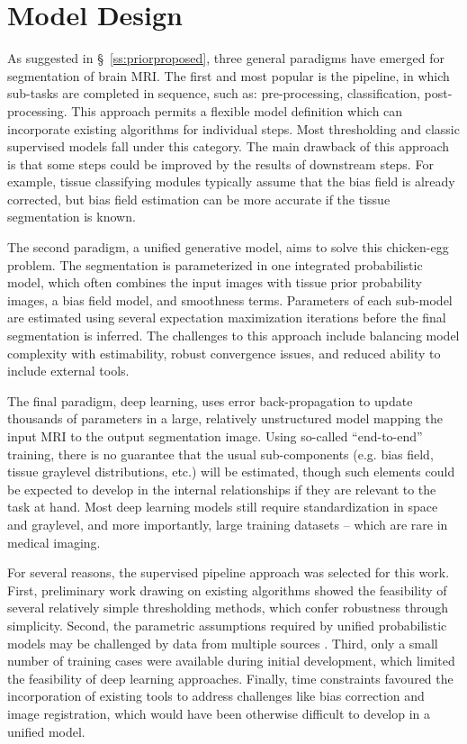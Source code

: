 \section{Model Design}\label{s:modelconcept}
As suggested in \S\ \ref{ss:priorproposed}, three general paradigms have emerged for segmentation of brain MRI.
The first and most popular is the pipeline, in which sub-tasks are completed in sequence, such as: pre-processing, classification, post-processing.
This approach permits a flexible model definition which can incorporate existing algorithms for individual steps.
Most thresholding and classic supervised models fall under this category.
The main drawback of this approach is that some steps could be improved by the results of downstream steps.
For example, tissue classifying modules typically assume that the bias field is already corrected, but bias field estimation can be more accurate if the tissue segmentation is known.
\par
The second paradigm, a unified generative model, aims to solve this chicken-egg problem.
The segmentation is parameterized in one integrated probabilistic model, which often combines the input images with tissue prior probability images, a bias field model, and smoothness terms.
Parameters of each sub-model are estimated using several expectation maximization iterations before the final segmentation is inferred.
The challenges to this approach include balancing model complexity with estimability, robust convergence issues, and reduced ability to include external tools.
\par
The final paradigm, deep learning, uses error back-propagation to update thousands of parameters in a large, relatively unstructured model mapping the input MRI to the output segmentation image.
Using so-called ``end-to-end'' training, there is no guarantee that the usual sub-components (e.g. bias field, tissue graylevel distributions, etc.) will be estimated, though such elements could be expected to develop in the internal relationships if they are relevant to the task at hand.
Most deep learning models still require standardization in space and graylevel, and more importantly, large training datasets -- which are rare in medical imaging.
\par
For several reasons, the supervised pipeline approach was selected for this work.
First, preliminary work drawing on existing algorithms \cite{Khademi2014,Schmidt2015} showed the feasibility of several relatively simple thresholding methods, which confer robustness through simplicity.
Second, the parametric assumptions required by unified probabilistic models may be challenged by data from multiple sources \cite{VanLeemput2001}.
Third, only a small number of training cases were available during initial development, which limited the feasibility of deep learning approaches.
Finally, time constraints favoured the incorporation of existing tools to address challenges like bias correction and image registration, which would have been otherwise difficult to develop in a unified model.
